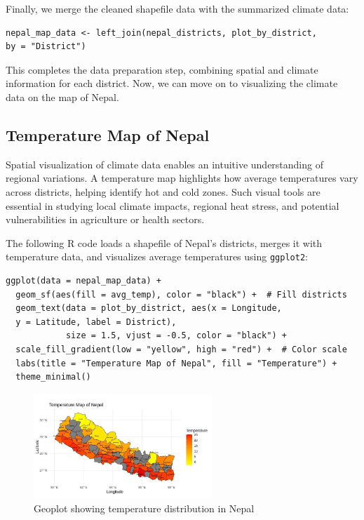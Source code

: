 Finally, we merge the cleaned shapefile data with the summarized climate data:
\begin{verbatim}
nepal_map_data <- left_join(nepal_districts, plot_by_district, 
by = "District")
\end{verbatim}

This completes the data preparation step, combining spatial and climate information for each district. Now, we can move on to visualizing the climate data on the map of Nepal.

\subsection*{Temperature Map of Nepal}

Spatial visualization of climate data enables an intuitive understanding of regional variations. A temperature map highlights how average temperatures vary across districts, helping identify hot and cold zones. Such visual tools are essential in studying local climate impacts, regional heat stress, and potential vulnerabilities in agriculture or health sectors.

The following R code loads a shapefile of Nepal’s districts, merges it with temperature data, and visualizes average temperatures using \texttt{ggplot2}:

\begin{verbatim}
ggplot(data = nepal_map_data) +
  geom_sf(aes(fill = avg_temp), color = "black") +  # Fill districts
  geom_text(data = plot_by_district, aes(x = Longitude, 
  y = Latitude, label = District),
            size = 1.5, vjust = -0.5, color = "black") +
  scale_fill_gradient(low = "yellow", high = "red") +  # Color scale
  labs(title = "Temperature Map of Nepal", fill = "Temperature") +
  theme_minimal()
\end{verbatim}

\begin{figure}[h]
\centering
\includegraphics[width=0.6\textwidth]{figures/geo_temp.jpg}
\caption{Geoplot showing temperature distribution in Nepal}
\label{fig:temp_map_nepal}
\end{figure}

